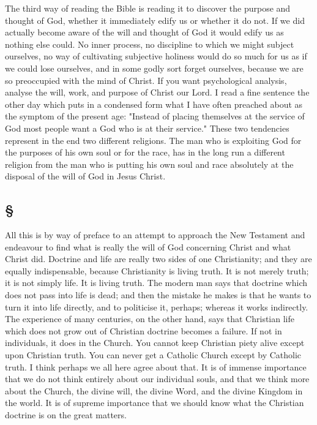 \documentclass[draft]{ptfdoc}
\begin{document}
The third way of reading the Bible is reading 
it to discover the purpose and thought of God, 
whether it immediately edify us or whether it 
do not. If we did actually become aware of the 
will and thought of God it would edify us as 
nothing else could. No inner process, no discipline 
to which we might subject ourselves, no 
way of cultivating subjective holiness would do 
so much for us as if we could lose ourselves, and 
in some godly sort forget ourselves, because we 
are so preoccupied with the mind of Christ. If 
you want psychological analysis, analyse the 
will, work, and purpose of Christ our Lord. I 
read a fine sentence the other day which puts in 
a condensed form what I have often preached 
about as the symptom of the present age: 
"Instead of placing themselves at the service 
of God most people want a God who is at their 
service." These two tendencies represent in the 
end two different religions. The man who is 
exploiting God for the purposes of his own soul 
or for the race, has in the long run a different 
religion from the man who is putting his own 
soul and race absolutely at the disposal of the 
will of God in Jesus Christ. 

\subsection*{
\S
}

All this is by way of preface to an attempt to 
approach the New Testament and endeavour to 
find what is really the will of God concerning 
Christ and what Christ did. Doctrine and life 
are really two sides of one Christianity; and 
they are equally indispensable, because Christianity 
is living truth. It is not merely 
truth; it is not simply life. It is living 
truth. The modern man says that doctrine 
which does not pass into life is dead; 
and then the mistake he makes is that he 
wants to turn it into life directly, and to 
politicise it, perhaps; whereas it works indirectly.
The experience of many centuries, 
on the other hand, says that Christian life 
which does not grow out of Christian doctrine 
becomes a failure. If not in individuals, it 
does in the Church. You cannot keep Christian 
piety alive except upon Christian truth. You 
can never get a Catholic Church except by 
Catholic truth. I think perhaps we all here 
agree about that. It is of immense importance 
that we do not think entirely about our individual 
souls, and that we think more about 
the Church, the divine will, the divine Word, 
and the divine Kingdom in the world. It is 
of supreme importance that we should know 
what the Christian doctrine is on the great 
matters. 
\end{document}
